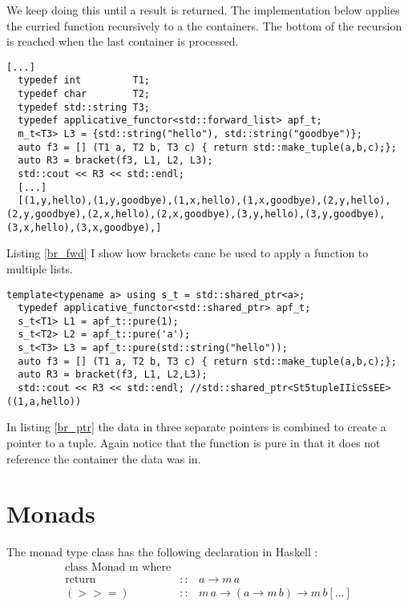 \documentclass[12pt,fleqn]{article}
\begin{document}
We keep doing this until a result is returned.
The implementation below applies the curried function recursively to a the containers. 
The bottom of the recursion is reached when the last container is processed.
\begin{lstlisting}[caption=applicative functor for the std::forward\_list using brackets, label=br_fwd]
[...]
  typedef int         T1;
  typedef char        T2;
  typedef std::string T3;
  typedef applicative_functor<std::forward_list> apf_t;
  m_t<T3> L3 = {std::string("hello"), std::string("goodbye")};
  auto f3 = [] (T1 a, T2 b, T3 c) { return std::make_tuple(a,b,c);};
  auto R3 = bracket(f3, L1, L2, L3);
  std::cout << R3 << std::endl;
  [...]
  [(1,y,hello),(1,y,goodbye),(1,x,hello),(1,x,goodbye),(2,y,hello),(2,y,goodbye),(2,x,hello),(2,x,goodbye),(3,y,hello),(3,y,goodbye),(3,x,hello),(3,x,goodbye),]
\end{lstlisting}

Listing \ref{br_fwd} I show how brackets cane be used to apply a function to multiple lists.

\begin{lstlisting}[caption=applicative functor for shared pointers applied using bracket notation, label=br_ptr]
  template<typename a> using s_t = std::shared_ptr<a>;
  typedef applicative_functor<std::shared_ptr> apf_t;
  s_t<T1> L1 = apf_t::pure(1);
  s_t<T2> L2 = apf_t::pure('a');
  s_t<T3> L3 = apf_t::pure(std::string("hello"));
  auto f3 = [] (T1 a, T2 b, T3 c) { return std::make_tuple(a,b,c);};
  auto R3 = bracket(f3, L1, L2,L3);
  std::cout << R3 << std::endl; //std::shared_ptr<St5tupleIIicSsEE>((1,a,hello))
\end{lstlisting}

In listing \ref{br_ptr} the data in three separate pointers is combined to create a pointer to a tuple.
Again notice that the function is pure in that it does not reference the container the data was in.


\section*{Monads}


The monad type class has the following declaration in Haskell :
\begin{eqnarray*}
\mbox{class Monad m where} \\
\mbox{return} &::& a \rightarrow m \, a \\
(>>=) &::& m \, a \rightarrow ( a \rightarrow m \, b) \rightarrow m \, b
[...] 
\end{eqnarray*}
\end{document}
